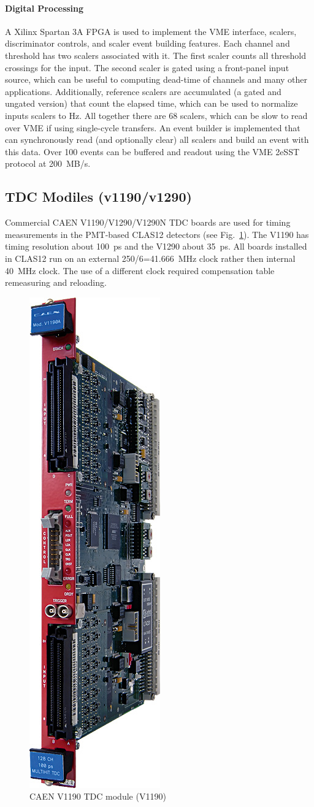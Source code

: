 \paragraph{Digital Processing}
A Xilinx Spartan 3A FPGA is used to implement the VME interface, scalers, discriminator controls, and scaler event building features. Each channel and threshold has two scalers associated with it. The first scaler counts all threshold crossings for the input. The second scaler is gated using a front-panel input source, which can be useful to computing dead-time of channels and many other applications. Additionally, reference scalers are accumulated (a gated and ungated version) that count the elapsed time, which can be used to normalize inputs scalers to Hz. All together there are 68 scalers, which can be slow to read over VME if using single-cycle transfers. An event builder is implemented that can synchronously read (and optionally clear) all scalers and build an event with this data. Over 100 events can be buffered and readout using the VME 2eSST protocol at 200~MB/s.


\subsection{TDC Modiles (v1190/v1290)}

Commercial CAEN V1190/V1290/V1290N TDC \cite{tdc-ref} boards are used for timing measurements in the PMT-based CLAS12 detectors (see Fig.~\ref{fig:v1190_board}). The V1190 has timing resolution about 100~ps and the V1290 about 35~ps. All boards installed in CLAS12 run on an external 250/6=41.666~MHz clock rather then internal 40~MHz clock. The use of a different clock required compensation table remeasuring and reloading.

\begin{figure}[hbt]
	\centering
	\includegraphics[width=0.2\columnwidth,keepaspectratio]{img/v1190_board.jpg}
	\caption{CAEN V1190 TDC module (V1190)}
	\label{fig:v1190_board}
\end{figure}

